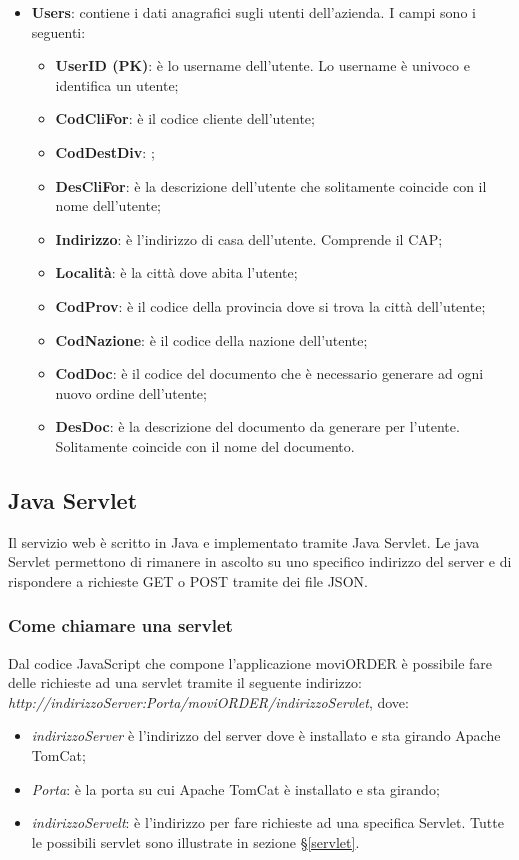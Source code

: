 \begin{itemize}
\begin{itemize}
		\end{itemize}
	\item \textbf{Users}: contiene i dati anagrafici sugli utenti dell'azienda. I campi sono i seguenti:
		\begin{itemize}
			\item \textbf{UserID (PK)}: è lo username dell'utente. Lo username è univoco e identifica un utente;
			\item \textbf{CodCliFor}: è il codice cliente dell'utente;
			\item \textbf{CodDestDiv}: ;
			\item \textbf{DesCliFor}: è la descrizione dell'utente che solitamente coincide con il nome dell'utente;
			\item \textbf{Indirizzo}: è l'indirizzo di casa dell'utente. Comprende il CAP;
			\item \textbf{Località}: è la città dove abita l'utente;
			\item \textbf{CodProv}: è il codice della provincia dove si trova la città dell'utente;
			\item \textbf{CodNazione}: è il codice della nazione dell'utente;
			\item \textbf{CodDoc}: è il codice del documento che è necessario generare ad ogni nuovo ordine dell'utente;
			\item \textbf{DesDoc}: è la descrizione del documento da generare per l'utente. Solitamente coincide con il nome del documento.
		\end{itemize}
\end{itemize}

\subsection{Java Servlet}

Il servizio web è scritto in Java e implementato tramite Java Servlet. Le java Servlet permettono di rimanere in ascolto su uno specifico indirizzo del server e di rispondere a richieste GET o POST tramite dei file JSON.

\subsubsection{Come chiamare una servlet}

Dal codice JavaScript che compone l'applicazione moviORDER è possibile fare delle richieste ad una servlet tramite il seguente indirizzo: \textit{http://indirizzoServer:Porta/moviORDER/indirizzoServlet}, dove:
\begin{itemize}
	\item \textit{indirizzoServer} è l'indirizzo del server dove è installato e sta girando Apache TomCat;
	\item \textit{Porta}: è la porta su cui Apache TomCat è installato e sta girando;
	\item \textit{indirizzoServelt}: è l'indirizzo per fare richieste ad una specifica Servlet. Tutte le possibili servlet sono illustrate in sezione §\ref{servlet}.
\end{itemize}

